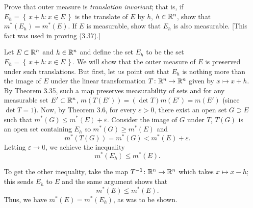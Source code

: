 \begin{problem}
  Prove that outer measure is \emph{translation invariant}; that is, if
  $E_h=\left\{\,x+h:x\in E\,\right\}$  is the translate of
  $E$ by $h$, $h\in\mathbb{R}^n$, show that $m^*(E_h)=m^*(E)$. If $E$ is
  measurable, show that $E_h$ is also measurable. [This fact was used in
  proving (3.37).]
\end{problem}
\begin{solution}
  Let $E\subset\mathbb{R}^n$ and $h\in\mathbb{R}^n$ and define the set $E_h$ to be the
  set $E_h=\left\{\,x+h:x\in E\,\right\}$. We will show that the outer
  measure of $E$ is preserved under such translations. But first, let us
  point out that $E_h$ is nothing more than the image of $E$ under the
  linear transformation $T\colon\mathbb{R}^n\to\mathbb{R}^n$ given by $x\mapsto
  x+h$. By Theorem 3.35, such a map preserves measurability of sets and for
  any measurable set $E'\subset\mathbb{R}^n$, $m(T(E'))=(\det T)m(E')=m(E')$
  (since $\det T=1$). Now, by Theorem 3.6, for every $\varepsilon>0$, there
  exist an open set $G\supset E$ such that $m^*(G)\leq
  m^*(E)+\varepsilon$. Consider the image of $G$ under $T$, $T(G)$ is an
  open set containing $E_h$ so $m^*(G)\geq m^*(E)$ and
  \[
    m^*(T(G))=m^*(G)<m^*(E)+\varepsilon.
  \]
  Letting $\varepsilon\to 0$, we achieve the inequality
  \[
    m^*(E_h)\leq m^*(E).
  \]

  To get the other inequality, take the map $T^{-1}\colon\mathbb{R}^n\to\mathbb{R}^n$
  which takes $x\mapsto x-h$; this sends $E_h$ to $E$ and the same argument
  shows that
  \[
    m^*(E)\leq m^*(E).
  \]
  Thus, we have $m^*(E)=m^*(E_h)$, as was to be shown.
\end{solution}

